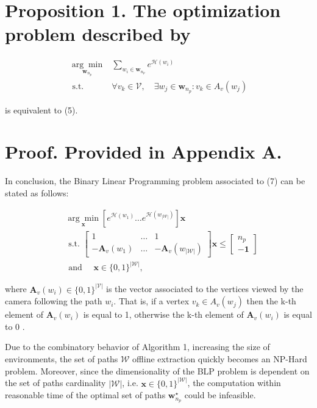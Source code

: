\documentclass[conference]{IEEEtran}
\begin{document}
\section*{Proposition 1. The optimization problem described by}

\begin{align*}
\underset{\boldsymbol{w}_{n_{p}}}{\arg \min } & \sum_{w_{i} \in \boldsymbol{w}_{n_{p}}} e^{\mathcal{H}\left(w_{i}\right)}  \tag{7}\\
\text { s.t. } & \forall v_{k} \in \mathcal{V}, \quad \exists w_{j} \in \boldsymbol{w}_{n_{p}}: v_{k} \in A_{v}\left(w_{j}\right)
\end{align*}


is equivalent to (5).

\section*{Proof. Provided in Appendix A.}
In conclusion, the Binary Linear Programming problem associated to (7) can be stated as follows:

$$
\begin{aligned}
& \underset{\mathbf{x}}{\arg \min }\left[e^{\mathcal{H}\left(w_{1}\right)} \ldots e^{\mathcal{H}\left(w_{|\mathcal{W}|}\right)}\right] \mathbf{x} \\
& \text { s.t. }\left[\begin{array}{ccc}
1 & \ldots & 1 \\
-\mathbf{A}_{v}\left(w_{1}\right) & \ldots & -\mathbf{A}_{v}\left(w_{|\mathcal{W}|}\right)
\end{array}\right] \mathbf{x} \leq\left[\begin{array}{c}
n_{p} \\
\mathbf{- 1}
\end{array}\right] \\
& \text { and } \quad \mathbf{x} \in\{0,1\}^{|\mathcal{W}|} \text {, }
\end{aligned}
$$

where $\mathbf{A}_{v}\left(w_{i}\right) \in\{0,1\}^{|\mathcal{V}|}$ is the vector associated to the vertices viewed by the camera following the path $w_{i}$. That is, if a vertex $v_{k} \in A_{v}\left(w_{j}\right)$ then the k-th element of $\mathbf{A}_{v}\left(w_{i}\right)$ is equal to 1, otherwise the k-th element of $\mathbf{A}_{v}\left(w_{i}\right)$ is equal to 0 .

Due to the combinatory behavior of Algorithm 1, increasing the size of environments, the set of paths $\mathcal{W}$ offline extraction quickly becomes an NP-Hard problem. Moreover, since the dimensionality of the BLP problem is dependent on the set of paths cardinality $|\mathcal{W}|$, i.e. $\mathbf{x} \in\{0,1\}^{|\mathcal{W}|}$, the computation within reasonable time of the optimal set of paths $\mathbf{w}_{n_{p}}^{\star}$ could be infeasible.
\end{document}
